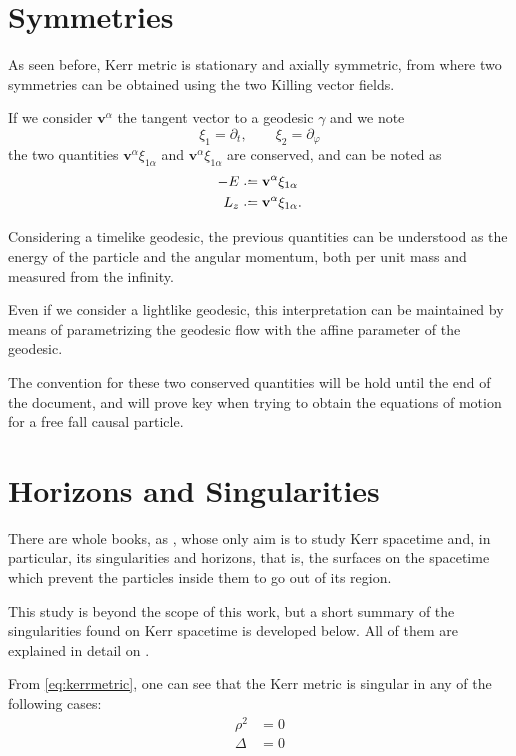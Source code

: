 \section{Symmetries}

As seen before, Kerr metric is stationary and axially symmetric, from where two symmetries can be obtained using the two Killing vector fields.

If we consider $\mathbf{v}^\alpha$ the tangent vector to a geodesic $\gamma$ and we note
\[
	\xi_1 = \partial_t, \qquad \xi_2 = \partial_\varphi
\]
the two quantities $\mathbf{v}^\alpha \xi_{1\alpha}$ and $\mathbf{v}^\alpha \xi_{1\alpha}$ are conserved, and can be noted as
\begin{align}
	\label{eq:energy}
	-E &\defeq \mathbf{v}^\alpha \xi_{1\alpha} \\
	L_z &\defeq \mathbf{v}^\alpha \xi_{1\alpha}.
\end{align}

Considering a timelike geodesic, the previous quantities can be understood as the energy of the particle and the angular momentum, both per unit mass and measured from the infinity.

Even if we consider a lightlike geodesic, this interpretation can be maintained by means of parametrizing the geodesic flow with the affine parameter of the geodesic.

The convention for these two conserved quantities will be hold until the end of the document, and will prove key when trying to obtain the equations of motion for a free fall causal particle.


\section{Horizons and Singularities}

There are whole books, as \cite{oneill95}, whose only aim is to study Kerr spacetime and, in particular, its singularities and horizons, that is, the surfaces on the spacetime which prevent the particles inside them to go out of its region.

This study is beyond the scope of this work, but a short summary of the singularities found on Kerr spacetime is developed below. All of them are explained in detail on \cite[Sec. 2.4]{galindo14}.

From \autoref{eq:kerrmetric}, one can see that the Kerr metric is singular in any of the following cases:
\begin{align}
	\rho^2 &= 0 \\
	\Delta &= 0
\end{align}

